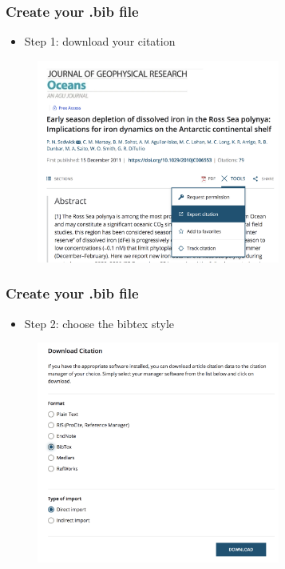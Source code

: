 \documentclass{beamer}
\begin{document}
\begin{frame}[fragile]
\frametitle{Create your .bib file}
\begin{itemize}
\item Step 1: download your citation
\end{itemize}
\begin{figure}
\includegraphics[width=80mm]{figures/Bib1.png}
\end{figure}
\end{frame}

\begin{frame}[fragile]
\frametitle{Create your .bib file}
\begin{itemize}
\item Step 2: choose the bibtex style
\end{itemize}
\begin{figure}
\includegraphics[width=80mm]{figures/Bib2.png}
\end{figure}
\end{frame}
\end{document}
